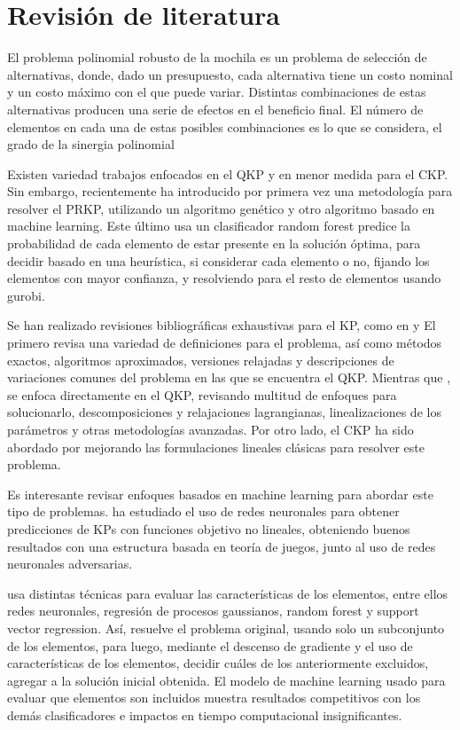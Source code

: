 \documentclass[spanish, a4paper, 12pt, twoside, openany,final]{book}
\numberwithin{equation}{section}
\begin{document}
\section{Revisión de literatura}
El problema polinomial robusto de la mochila es un problema de selección de alternativas, donde, dado un presupuesto, cada alternativa tiene un costo nominal y un costo máximo con el que puede variar. Distintas combinaciones de estas alternativas producen una serie de efectos en el beneficio final. El número de elementos en cada una de estas posibles combinaciones es lo que se considera, el grado de la sinergia polinomial

Existen variedad trabajos enfocados en el QKP y en menor medida para el CKP. Sin embargo, recientemente \cite{baldo_polynomial_2023} ha introducido por primera vez una metodología para resolver el PRKP, utilizando un algoritmo genético y otro algoritmo basado en machine learning. Este último usa un clasificador random forest predice la probabilidad de cada elemento de estar presente en la solución óptima, para decidir basado en una heurística, si considerar cada elemento o no, fijando los elementos con mayor confianza, y resolviendo para el resto de elementos usando gurobi.

Se han realizado revisiones bibliográficas exhaustivas para el KP, como en \cite{kellerer_knapsack_2004} y \cite{pisinger_quadratic_2007} El primero revisa una variedad de definiciones para el problema, así como métodos exactos, algoritmos aproximados, versiones relajadas y descripciones de variaciones comunes del problema en las que se encuentra el QKP. Mientras que \cite{pisinger_quadratic_2007}, se enfoca directamente en el QKP, revisando multitud de enfoques para solucionarlo, descomposiciones y relajaciones lagrangianas, linealizaciones de los parámetros y otras metodologías avanzadas.  Por otro lado, el CKP ha sido abordado por \cite{forrester_strengthening_2022} mejorando las formulaciones lineales clásicas para resolver este problema.

Es interesante revisar enfoques basados en machine learning para abordar este tipo de problemas. \cite{li_novel_2021} ha estudiado el uso de redes neuronales para obtener predicciones de KPs con funciones objetivo no lineales, obteniendo buenos resultados con una estructura basada en teoría de juegos, junto al uso de redes neuronales adversarias.

\cite{rezoug_application_2022} usa distintas técnicas para evaluar las características de los elementos, entre ellos redes neuronales, regresión de procesos gaussianos, random forest y support vector regression. Así, resuelve el problema original, usando solo un subconjunto de los elementos, para luego, mediante el descenso de gradiente y el uso de características de los elementos, decidir cuáles de los anteriormente excluidos, agregar a la solución inicial obtenida. El modelo de machine learning usado para evaluar que elementos son incluidos muestra resultados competitivos con los demás clasificadores e impactos en tiempo computacional insignificantes.
\end{document}
